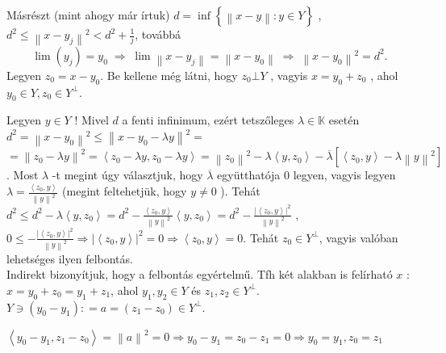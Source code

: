 \documentclass[12pt,a4paper]{scrartcl}
\newenvironment{bizonyitas}{}{}
\begin{document}
\begin{bizonyitas}
Másrészt (mint ahogy már írtuk)
\(d = \inf\left\{ {\left\| {x - y} \right\|:y \in Y} \right\}\) ,
\(d^{2} \leq \left\| {x - y_{j}} \right\|^{2} < d^{2} + \frac{1}{j}\),
továbbá
\[\lim \left( {{y_j}} \right) = {y_0}\; \Rightarrow \;\lim \left\| {x - {y_j}} \right\| = \left\| {x - {y_0}} \right\|\; \Rightarrow \;{\left\| {x - {y_0}} \right\|^2} = {d^2}.\]
Legyen \(z_{0} = x - y_{0}\). Be kellene még látni, hogy \(z_{0}\bot Y\)
, vagyis \(x = y_{0} + z_{0}\) , ahol
\(y_{0} \in Y,z_{0} \in Y^{\bot}\).

Legyen \(y \in Y\) ! Mivel \(d\) a fenti infinimum, ezért tetszőleges
\(\lambda \in {\mathbb{K}}\) esetén
\(d^{2} = \left\| {x - y_{0}} \right\|^{2} \leq \left\| {x - y_{0} - \lambda y} \right\|^{2} =\)
\(= \left\| {z_{0} - \lambda y} \right\|^{2} = \left\langle {z_{0} - \lambda y,z_{0} - \lambda y} \right\rangle = \left\| z_{0} \right\|^{2} - \lambda\left\langle {y,z_{0}} \right\rangle - \overline{\lambda}\left\lbrack {\left\langle {z_{0},y} \right\rangle - \lambda\left\| y \right\|^{2}} \right\rbrack\).
Most \(\lambda\) -t megint úgy választjuk, hogy \(\overline{\lambda}\)
együtthatója 0 legyen, vagyis legyen
\(\lambda = \frac{\left\langle {z_{0},y} \right\rangle}{\left\| y \right\|^{2}}\)
(megint feltehetjük, hogy \(y \neq 0\) ). Tehát
\(d^{2} \leq d^{2} - \lambda\left\langle {y,z_{0}} \right\rangle = d^{2} - \frac{\left\langle {z_{0},y} \right\rangle}{\left\| y \right\|^{2}}\left\langle {y,z_{0}} \right\rangle = d^{2} - \frac{\left| \left\langle {z_{0},y} \right\rangle \right|^{2}}{\left\| y \right\|^{2}}\)
,
\(\left. 0 \leq - \frac{\left| \left\langle {z_{0},y} \right\rangle \right|^{2}}{\left\| y \right\|^{2}}\Rightarrow\left| \left\langle {z_{0},y} \right\rangle \right|^{2} = 0\Rightarrow\left\langle {z_{0},y} \right\rangle = 0 \right.\).
Tehát \(z_{0} \in Y^{\bot}\), vagyis valóban lehetséges ilyen
felbontás.\\
Indirekt bizonyítjuk, hogy a felbontás egyértelmű. Tfh két alakban is
felírható \(x\) : \(x = y_{0} + z_{0} = y_{1} + z_{1}\), ahol
\(y_{1},y_{2} \in Y\) és \(z_{1},z_{2} \in Y^{\bot}\).
\(Y \ni \left( {y_{0} - y_{1}} \right): = a = \left( {z_{1} - z_{0}} \right) \in Y^{\bot}\).

\(\left. \left\langle {y_{0} - y_{1},z_{1} - z_{0}} \right\rangle = \left\| a \right\|^{2} = 0\Rightarrow y_{0} - y_{1} = z_{0} - z_{1} = 0\Rightarrow y_{0} = y_{1},z_{0} = z_{1} \right.\)

\end{bizonyitas}
\end{document}
